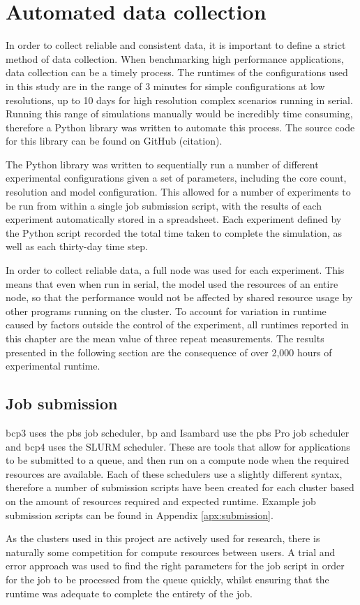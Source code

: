 \documentclass[a4paper,11pt]{report}
\begin{document}
\section{Automated data collection}
In order to collect reliable and consistent data, it is important to define a strict method of data collection. When benchmarking high performance applications, data collection can be a timely process. The runtimes of the configurations used in this study are in the range of 3 minutes for simple configurations at low resolutions, up to 10 days for high resolution complex scenarios running in serial. Running this range of simulations manually would be incredibly time consuming, therefore a Python library was written to automate this process. The source code for this library can be found on GitHub (citation). 
\par
The Python library was written to sequentially run a number of different experimental configurations given a set of parameters, including the core count, resolution and model configuration. This allowed for a number of experiments to be run from within a single job submission script, with the results of each experiment automatically stored in a spreadsheet. Each experiment defined by the Python script recorded the total time taken to complete the simulation, as well as each thirty-day time step. 
\par
In order to collect reliable data, a full node was used for each experiment. This means that even when run in serial, the model used the resources of an entire node, so that the performance would not be affected by shared resource usage by other programs running on the cluster. To account for variation in runtime caused by factors outside the control of the experiment, all runtimes reported in this chapter are the mean value of three repeat measurements. The results presented in the following section are the consequence of over 2,000 hours of experimental runtime.


\subsection{Job submission}
\gls{bcp3} uses the \gls{pbs} job scheduler, \gls{bp} and Isambard use the \gls{pbs} Pro job scheduler and \gls{bcp4} uses the SLURM scheduler. These are tools that allow for applications to be submitted to a queue, and then run on a compute node when the required resources are available. Each of these schedulers use a slightly different syntax, therefore a number of submission scripts have been created for each cluster based on the amount of resources required and expected runtime. Example job submission scripts can be found in Appendix \ref{apx:submission}. 
\par
As the clusters used in this project are actively used for research, there is naturally some competition for compute resources between users. A trial and error approach was used to find the right parameters for the job script in order for the job to be processed from the queue quickly, whilst ensuring that the runtime was adequate to complete the entirety of the job.
\end{document}
